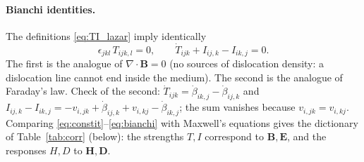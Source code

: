 \documentclass[12pt,a4paper]{article}
\begin{document}
\paragraph{Bianchi identities.} The definitions \eqref{eq:TI_lazar} imply
identically \cite[eq.~(2)]{lazar2010pla}
\begin{equation}
\epsilon_{jkl}\,T_{ijk,l}=0,\qquad \dot T_{ijk}+I_{ij,k}-I_{ik,j}=0.
\label{eq:bianchi}
\end{equation}
The first is the analogue of $\nabla\cdot\mathbf B=0$ (no sources of dislocation
density: a dislocation line cannot end inside the medium). The second is the analogue
of Faraday's law. Check of the second: $\dot T_{ijk}=\dot\beta_{ik,j}-\dot\beta_{ij,k}$
and $I_{ij,k}-I_{ik,j}=-v_{i,jk}+\dot\beta_{ij,k}+v_{i,kj}-\dot\beta_{ik,j}$; the sum
vanishes because $v_{i,jk}=v_{i,kj}$.
Comparing \eqref{eq:constit}--\eqref{eq:bianchi} with Maxwell's equations gives
the dictionary of Table~\ref{tab:corr} (below): the strengths $T,I$ correspond to
$\mathbf B,\mathbf E$, and the responses $H,D$ to $\mathbf H,\mathbf D$.
\end{document}
